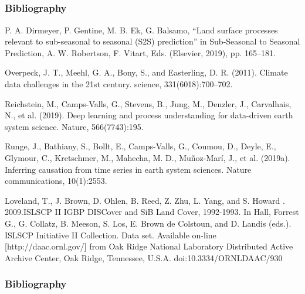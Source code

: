 \documentclass[11pt]{beamer}
\begin{document}
\subsection{}
\begin{thebibliography}{99}
  
  \begin{frame}
    \frametitle{\normalsize{\textbf{
          Bibliography 
    }}}

    \scriptsize{
      
    \bibitem{}
      P. A. Dirmeyer, P. Gentine, M. B. Ek, G. Balsamo, “Land surface processes
      relevant to sub-seasonal to seasonal (S2S) prediction” in Sub-Seasonal to
      Seasonal Prediction, A. W. Robertson, F. Vitart, Eds. (Elsevier, 2019),
      pp. 165–181.

    \bibitem{}
      Overpeck, J. T., Meehl, G. A., Bony, S., and Easterling,
      D. R. (2011). Climate data challenges in the 21st century. science,
      331(6018):700–702.
      
    \bibitem{}
      Reichstein, M., Camps-Valls, G., Stevens, B., Jung, M., Denzler, J.,
      Carvalhais, N., et al. (2019). Deep learning and process understanding for
      data-driven earth system science. Nature, 566(7743):195.
      
    \bibitem{}
      Runge, J., Bathiany, S., Bollt, E., Camps-Valls, G., Coumou, D., Deyle,
      E., Glymour, C., Kretschmer, M., Mahecha, M. D., Muñoz-Marí, J., et
      al. (2019a). Inferring causation from time series in earth system
      sciences. Nature communications, 10(1):2553. 

    \bibitem{}
      Loveland, T., J. Brown, D. Ohlen, B. Reed, Z. Zhu, L. Yang, and S. Howard
      . 2009.ISLSCP II IGBP DISCover and SiB Land Cover, 1992-1993. In Hall,
      Forrest G., G. Collatz, B. Meeson, S. Los, E. Brown de Colstoun, and
      D. Landis (eds.). ISLSCP Initiative II Collection. Data set. Available
      on-line [http://daac.ornl.gov/] from Oak Ridge National Laboratory
      Distributed Active Archive Center, Oak Ridge, Tennessee,
      U.S.A. doi:10.3334/ORNLDAAC/930 

    } 

  \end{frame}

  \begin{frame}
    \frametitle{\normalsize{\textbf{
          Bibliography 
    }}}

    \scriptsize{
      
}
\end{frame}
\end{thebibliography}
\end{document}
